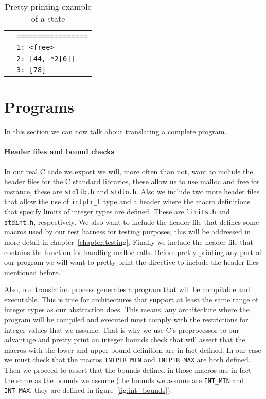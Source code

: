 \begin{table}[h!]
\begin{tabular}{|l|l|}
                                                                                                               & \verb|=================| \\
                                                                                                               & \verb|1: <free>| \\
                                                                                                               & \verb|2: [44, *2[0]]| \\
                                                                                                               & \verb|3: [78]| \\
  \hline
\end{tabular}

\caption{Pretty printing example of a state}
\label{tab:pretty_simp_state}
\end{table}


\section{Programs}

In this section we can now talk about translating a complete program.

\paragraph{Header files and bound checks}
In our real C code we export we will, more often than not, want to include the header files for the C standard libraries, these allow us to use malloc and free for instance, these are \verb|stdlib.h| and \verb|stdio.h|.
Also we include two more header files that allow the use of \verb|intptr_t| type and a header where the macro definitions that specify limits of integer types are defined.
These are \verb|limits.h| and \verb|stdint.h|, respectively.
We also want to include the header file that defines some macros used by our test harness for testing purposes, this will be addressed in more detail in chapter~\ref{chapter:testing}.
Finally we include the header file that contains the function for handling malloc calls.
Before pretty printing any part of our program we will want to pretty print the directive to include the header files mentioned before.


Also, our translation process generates a program that will be compilable and executable.
This is true for architectures that support at least the same range of integer types as our abstraction does.
This means, any architecture where the program will be compiled and executed must comply with the restrictions for integer values that we assume.
That is why we use C's preprocessor to our advantage and pretty print an integer bounds check that will assert that the macros with the lower and upper bound definition are in fact defined.
In our case we must check that the macros \verb|INTPTR_MIN| and \verb|INTPTR_MAX| are both defined.
Then we proceed to assert that the bounds defined in those macros are in fact the same as the bounds we assume (the bounds we assume are \verb|INT_MIN| and \verb|INT_MAX|, they are defined in figure~\ref{fig:int_bounds}).



